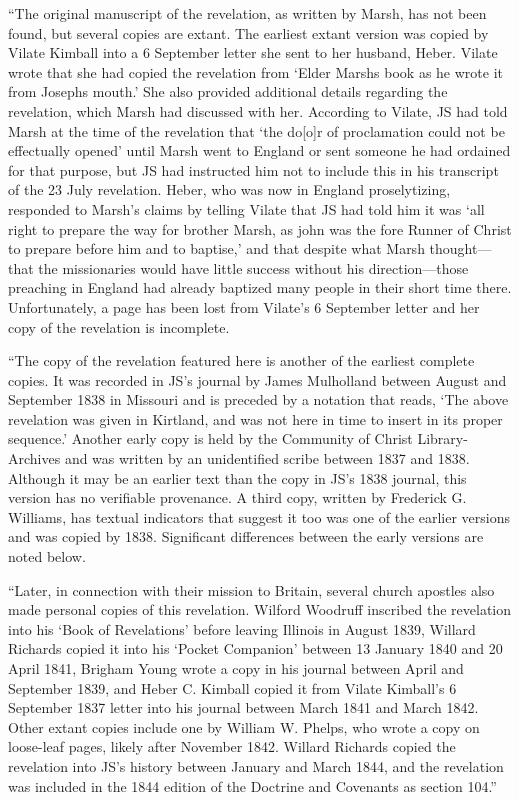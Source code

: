			``The original manuscript of the revelation, as written by Marsh, has not been found, but several copies are extant. The earliest extant version was copied by Vilate Kimball into a 6 September letter she sent to her husband, Heber. Vilate wrote that she had copied the revelation from `Elder Marshs book as he wrote it from Josephs mouth.' She also provided additional details regarding the revelation, which Marsh had discussed with her. According to Vilate, JS had told Marsh at the time of the revelation that `the do[o]r of proclamation could not be effectually opened' until Marsh went to England or sent someone he had ordained for that purpose, but JS had instructed him not to include this in his transcript of the 23 July revelation. Heber, who was now in England proselytizing, responded to Marsh's claims by telling Vilate that JS had told him it was `all right to prepare the way for brother Marsh, as john was the fore Runner of Christ to prepare before him and to baptise,' and that despite what Marsh thought---that the missionaries would have little success without his direction---those preaching in England had already baptized many people in their short time there. Unfortunately, a page has been lost from Vilate's 6 September letter and her copy of the revelation is incomplete.

			``The copy of the revelation featured here is another of the earliest complete copies. It was recorded in JS's journal by James Mulholland between August and September 1838 in Missouri and is preceded by a notation that reads, `The above revelation was given in Kirtland, and was not here in time to insert in its proper sequence.' Another early copy is held by the Community of Christ Library-Archives and was written by an unidentified scribe between 1837 and 1838. Although it may be an earlier text than the copy in JS's 1838 journal, this version has no verifiable provenance. A third copy, written by Frederick G. Williams, has textual indicators that suggest it too was one of the earlier versions and was copied by 1838. Significant differences between the early versions are noted below.

			``Later, in connection with their mission to Britain, several church apostles also made personal copies of this revelation. Wilford Woodruff inscribed the revelation into his `Book of Revelations' before leaving Illinois in August 1839, Willard Richards copied it into his `Pocket Companion' between 13 January 1840 and 20 April 1841, Brigham Young wrote a copy in his journal between April and September 1839, and Heber C. Kimball copied it from Vilate Kimball's 6 September 1837 letter into his journal between March 1841 and March 1842. Other extant copies include one by William W. Phelps, who wrote a copy on loose-leaf pages, likely after November 1842. Willard Richards copied the revelation into JS's history between January and March 1844, and the revelation was included in the 1844 edition of the Doctrine and Covenants as section 104.''
					
